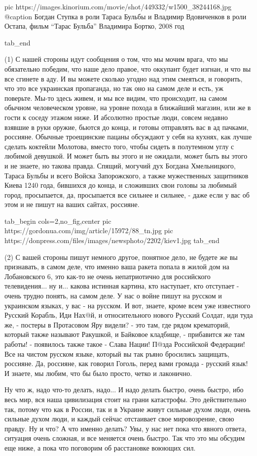 		 pic https://images.kinorium.com/movie/shot/449332/w1500_38244168.jpg
		 @caption Богдан Ступка в роли Тараса Бульбы и Владимир Вдовиченков в роли Остапа, фильм \enquote{Тарас Бульба} Владимира Бортко, 2008 год

  tab_end
\fi

(1) С нашей стороны идут сообщения о том, что мы мочим врага, что мы
обязательно победим, что наше дело правое, что оккупант будет изгнан, и что вы
все сгинете в аду. И вы можете сколько угодно над этим смеяться, и говорить,
что это все украинская пропаганда, но так оно на самом деле и есть, уж
поверьте.  Мы-то здесь живем, и мы все видим, что происходит, на самом обычном
человеческом уровне, на уровне похода в ближайший магазин, или же в гости к
соседу этажом ниже. И абсолютно простые люди, совсем недавно взявшие в руки
оружие, бьются до конца, и готовы отправлять вас в ад пачками, россияне.
Обычные троещинские пацаны обсуждают у себя на кухнях, как лучше сделать
коктейли Молотова, вместо того, чтобы сидеть в полутемном углу с любимой
девушкой. И может быть вы этого и не ожидали, может быть вы этого и не знаете,
но такова правда.  Спящий, могучий дух Богдана Хмельницкого, Тараса Бульбы и
всего Войска Запорожского, а также мужественных защитников Киева 1240 года,
бившихся до конца, и сложивших свои головы за любимый город, просыпается, да,
просыпается все сильнее и сильнее, - даже если у вас об этом и не пишут на
ваших сайтах, россияне.

\ifcmt
  tab_begin cols=2,no_fig,center
     pic https://gordonua.com/img/article/15972/88_tn.jpg
		 pic https://donpress.com/files/images/newsphoto/2202/kiev1.jpg
  tab_end
\fi

(2) С вашей стороны пишут немного другое, понятное дело, не будете же вы
признавать, в самом деле, что именно ваша ракета попала в жилой дом на
Лобановского 6, это как-то не очень непатриотично для российского
телевидения... ну и... какова истинная картина, кто наступает, кто отступает -
очень трудно понять, на самом деле. У нас о войне пишут на русском и украинском
языках, у вас - на русском. И вот, знаете, кроме всем уже известного Русский
Корабль, Иди Нах@й, и относительного нового Русский Солдат, иди туда же, -
постеры в Протасовом Яру видели? - это там, где рядом крематорий, который также
называют Ракушкой, и Байковое кладбище, - прибавится же там работы! - появилось
также такое - Слава Нации! П@зда Российской Федерации! Все на чистом русском
языке, который вы так ръяно бросились защищать, россияне. Да, россияне, как
говорил Гоголь, перед вами громада - русский язык! И знаете, мы любим, что бы
было просто, четко и лаконично.

Ну что ж, надо что-то делать, надо... И надо делать быстро, очень быстро, ибо
весь мир, вся наша цивилизация стоит на грани катастрофы. Это действительно
так, потому что как в России, так и в Украине живут сильные духом люди, очень
сильные духом люди, и каждый сейчас отстаивает свое мировозрение, свою правду.
Ну и что? А что именно делать? Увы, у нас нет пока что явного ответа, ситуация
очень сложная, и все меняется очень быстро. Так что это мы обсудим еще ниже, а
пока что поговорим об расстановке воюющих сил.

